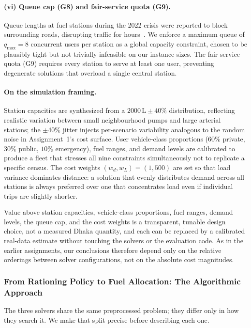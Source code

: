 \documentclass{ai-lab-report}
\begin{document}
\paragraph{(vi) Queue cap (G8) and fair-service quota (G9).} Queue lengths at fuel stations during the 2022 crisis were reported to block surrounding roads, disrupting traffic for hours~\citep{dailystar2022fuelration}. We enforce a maximum queue of $q_{\max}=8$ concurrent users per station as a global capacity constraint, chosen to be plausibly tight but not trivially infeasible on our instance sizes. The fair-service quota (G9) requires every station to serve at least one user, preventing degenerate solutions that overload a single central station.

\paragraph{On the simulation framing.} Station capacities are synthesized from a $2000\,\mathrm{L}\pm40\%$ distribution, reflecting 
realistic variation between small neighbourhood pumps and large arterial stations; the $\pm40\%$ jitter injects per-scenario variability 
analogous to the random noise in Assignment~1's cost surface. User vehicle-class proportions ($60\%$ private, $30\%$ public, $10\%$ emergency), 
fuel ranges, and demand levels are calibrated to produce a fleet that stresses all nine constraints simultaneously not to replicate a specific census. 
The cost weights $(w_d, w_L)=(1, 500)$ are set so that load variance dominates distance: a solution that evenly distributes demand across all 
stations is always preferred over one that concentrates load even if individual trips are slightly shorter. 

 Value above station capacities, vehicle-class proportions, fuel ranges, demand levels, the queue cap, and the cost weights is a transparent, tunable design choice, not a measured Dhaka quantity, and each can be replaced by a calibrated real-data estimate without touching the solvers or the evaluation code. As in the earlier assignments, our conclusions therefore depend only on the relative orderings between solver configurations, not on the absolute cost magnitudes.


\subsubsection{From Rationing Policy to Fuel Allocation: The Algorithmic Approach}

The three solvers share the same preprocessed problem; they differ only in how they search it. We make that split precise before describing each one.
\end{document}

